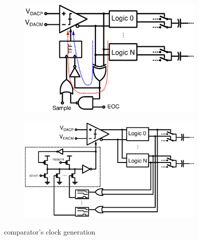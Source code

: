 \begin{figure}[htp]
	\centering
    \begin{subfigure}[b]{0.48\textwidth}
        \includegraphics[width=\textwidth]{sar_logic_JChen2011.ps}
        \label{fig:sar_logic_jchen2011}
	\end{subfigure}
	\begin{subfigure}[b]{0.44\textwidth}
        \includegraphics[width=\textwidth]{sar_logic_wong2013.ps}
        \label{fig:sar_logic_wong2013}
    \end{subfigure}
	\caption{comparator's clock generation}
	\label{fig:sar_cmp_clock}
\end{figure}

